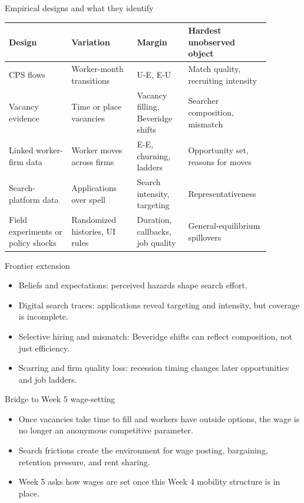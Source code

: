 \documentclass[aspectratio=169,11pt]{beamer}
\begin{document}
\begin{frame}{Empirical designs and what they identify}
\small
\begin{tabular}{p{0.22\linewidth} p{0.23\linewidth} p{0.18\linewidth} p{0.25\linewidth}}
\toprule
Design & Variation & Margin & Hardest unobserved object \\
\midrule
CPS flows & Worker-month transitions & U-E, E-U & Match quality, recruiting intensity \\
Vacancy evidence & Time or place vacancies & Vacancy filling, Beveridge shifts & Searcher composition, mismatch \\
Linked worker-firm data & Worker moves across firms & E-E, churning, ladders & Opportunity set, reasons for moves \\
Search-platform data & Applications over spell & Search intensity, targeting & Representativeness \\
Field experiments or policy shocks & Randomized histories, UI rules & Duration, callbacks, job quality & General-equilibrium spillovers \\
\bottomrule
\end{tabular}
\end{frame}

\begin{frame}{Frontier extension}
\begin{itemize}
    \item Beliefs and expectations: perceived hazards shape search effort.
    \item Digital search traces: applications reveal targeting and intensity, but coverage is incomplete.
    \item Selective hiring and mismatch: Beveridge shifts can reflect composition, not just efficiency.
    \item Scarring and firm quality loss: recession timing changes later opportunities and job ladders.
\end{itemize}
\end{frame}

\begin{frame}{Bridge to Week 5 wage-setting}
\begin{itemize}
    \item Once vacancies take time to fill and workers have outside options, the wage is no longer an anonymous competitive parameter.
    \item Search frictions create the environment for wage posting, bargaining, retention pressure, and rent sharing.
    \item Week 5 asks how wages are set once this Week 4 mobility structure is in place.
\end{itemize}
\end{frame}
\end{document}
